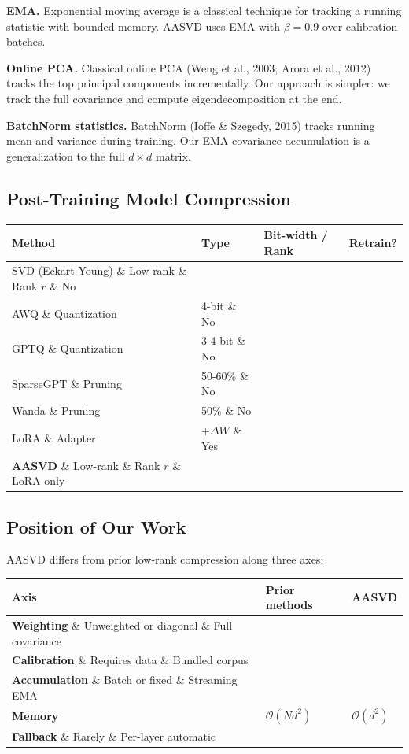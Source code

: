 \textbf{EMA.} Exponential moving average is a classical technique for tracking 
a running statistic with bounded memory. AASVD uses EMA with $\beta = 0.9$ 
over calibration batches.

\textbf{Online PCA.} Classical online PCA (Weng et al., 2003; Arora et al., 2012) 
tracks the top principal components incrementally. Our approach is simpler: 
we track the full covariance and compute eigendecomposition at the end.

\textbf{BatchNorm statistics.} BatchNorm (Ioffe \& Szegedy, 2015) tracks running 
mean and variance during training. Our EMA covariance accumulation is a 
generalization to the full $d \times d$ matrix.

\subsection{Post-Training Model Compression}

\begin{table}[H]
\centering
\small
\begin{tabular}{llll}
\toprule
\textbf{Method} & \textbf{Type} & \textbf{Bit-width / Rank} & \textbf{Retrain?} \\
\midrule
SVD (Eckart-Young) \& Low-rank \& Rank $r$ \& No \\
AWQ \& Quantization & 4-bit \& No \\
GPTQ \& Quantization & 3-4 bit \& No \\
SparseGPT \& Pruning & 50-60\% \& No \\
Wanda \& Pruning & 50\% \& No \\
LoRA \& Adapter & +$\Delta W$ \& Yes \\
\textbf{AASVD} \& Low-rank \& Rank $r$ \& LoRA only \\
\bottomrule
\end{tabular}
\end{table}

\subsection{Position of Our Work}

AASVD differs from prior low-rank compression along three axes:

\begin{table}[H]
\centering
\small
\begin{tabular}{lll}
\toprule
\textbf{Axis} & \textbf{Prior methods} & \textbf{AASVD} \\
\midrule
\textbf{Weighting} \& Unweighted or diagonal \& Full covariance \\
\textbf{Calibration} \& Requires data \& Bundled corpus \\
\textbf{Accumulation} \& Batch or fixed \& Streaming EMA \\
\textbf{Memory} & $\mathcal{O}(Nd^2)$ & $\mathcal{O}(d^2)$ \\
\textbf{Fallback} \& Rarely \& Per-layer automatic \\
\bottomrule
\end{tabular}
\end{table}

